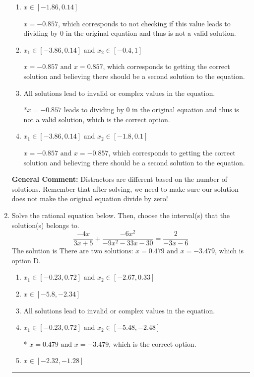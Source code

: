 \documentclass{extbook}[14pt]
\newcommand{\litem}[1]{\item #1

\rule{\textwidth}{0.4pt}}
\begin{document}
\begin{enumerate}
{\begin{enumerate}[label=\Alph*.]
$x = 0.857$, which corresponds to not distributing the factor $91x + 78$ correctly when trying to eliminate the fraction.
\item \( x \in [-1.86,0.14] \)

$x = -0.857$, which corresponds to not checking if this value leads to dividing by 0 in the original equation and thus is not a valid solution.
\item \( x_1 \in [-3.86, 0.14] \text{ and } x_2 \in [-0.4,1] \)

$x = -0.857 \text{ and } x = 0.857$, which corresponds to getting the correct solution and believing there should be a second solution to the equation.
\item \( \text{All solutions lead to invalid or complex values in the equation.} \)

*$x = -0.857$ leads to dividing by 0 in the original equation and thus is not a valid solution, which is the correct option.
\item \( x_1 \in [-3.86, 0.14] \text{ and } x_2 \in [-1.8,0.1] \)

$x = -0.857 \text{ and } x = -0.857$, which corresponds to getting the correct solution and believing there should be a second solution to the equation.
\end{enumerate}

\textbf{General Comment:} Distractors are different based on the number of solutions. Remember that after solving, we need to make sure our solution does not make the original equation divide by zero!
}
\litem{
Solve the rational equation below. Then, choose the interval(s) that the solution(s) belongs to.
\[ \frac{-4x}{3x + 5} + \frac{-6x^{2}}{-9x^{2} -33 x -30} = \frac{2}{-3x -6} \]The solution is \( \text{There are two solutions: } x = 0.479 \text{ and } x = -3.479 \), which is option D.\begin{enumerate}[label=\Alph*.]
\item \( x_1 \in [-0.23, 0.72] \text{ and } x_2 \in [-2.67,0.33] \)


\item \( x \in [-5.8,-2.34] \)


\item \( \text{All solutions lead to invalid or complex values in the equation.} \)


\item \( x_1 \in [-0.23, 0.72] \text{ and } x_2 \in [-5.48,-2.48] \)

* $x = 0.479 \text{ and } x = -3.479$, which is the correct option.
\item \( x \in [-2.32,-1.28] \)



\end{enumerate}}
\end{enumerate}
\end{document}
